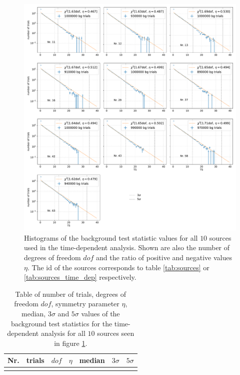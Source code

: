 \begin{figure}
    \centering
    \includegraphics[width=\linewidth]{Plots/05_csky/9_years_gfu_gold_time_dep_bg_t0.pdf}
    \caption{Histograms of the background test statistic values for all $\num{10}$ sources used in the time-dependent analysis. Shown are also the number of degrees of freedom $dof$ and the ratio of positive and negative values $\eta$. The id of the sources corresponds to table \ref{tab:sources} or \ref{tab:sources_time_dep} respectively.}
    \label{fig:bg_trials_time_dep}
\end{figure}

\begin{table}
  \centering
  \caption[]{Table of number of trials, degrees of freedom $dof$, symmetry parameter $\eta$, median\footnotemark, $\num{3}\sigma$ and $\num{5}\sigma$ values of the background test statistics for the time-dependent analysis for all $\num{10}$ sources seen in figure \ref{fig:bg_trials_time_dep}.}
  \begin{tabular}{crccccc}
    \toprule
    Nr. & trials & $dof$ & $\eta$ & median & $\num{3}\sigma$ & $\num{5}\sigma$ \\
    \toprule
      
    \toprule
    \label{tab:sigma_time_dep}
  \end{tabular}
\end{table}


